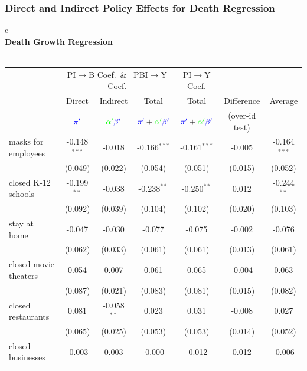 \documentclass{beamer}
\def\bcolor{\color{green}}
\def\pcolor{\color{blue}}
\renewcommand{\to}{{\rightarrow}}
\begin{document}

\begin{frame}
  \frametitle{Direct and Indirect Policy Effects for Death Regression}

\begin{table}
\begin{minipage}{\linewidth}
  \centering
    \tiny
  \begin{tabular}{c}
%    
      \\
    \textbf{{\normalsize Death Growth Regression}}
    \\
    \\
\begin{tabular}{lccc|c|cc}
\toprule
&\multicolumn{3}{c|}{ PI$\to$B Coef.\ \& \ PBI$\to$Y Coef.  } &PI$\to$Y Coef.  \\
  & Direct & Indirect & Total & Total  & Difference & Average\\\
  &${\pcolor\pi'}$&${\bcolor\alpha '}  {\pcolor \beta' }$ &${\pcolor\pi'}+{\bcolor\alpha '}  {\pcolor \beta' }$ &${\pcolor\pi'}+{\bcolor\alpha '}  {\pcolor \beta' }$  & (over-id test) \\
\midrule
masks for employees & -0.148$^{***}$ & -0.018 & -0.166$^{***}$ & -0.161$^{***}$ & -0.005 & -0.164$^{***}$\\
 & (0.049) & (0.022) & (0.054) & (0.051) & (0.015) & (0.052)\\
closed K-12 schools & -0.199$^{**}$ & -0.038 & -0.238$^{**}$ & -0.250$^{**}$ & 0.012 & -0.244$^{**}$\\
 & (0.092) & (0.039) & (0.104) & (0.102) & (0.020) & (0.103)\\
stay at home & -0.047 & -0.030 & -0.077 & -0.075 & -0.002 & -0.076\\
 & (0.062) & (0.033) & (0.061) & (0.061) & (0.013) & (0.061)\\
closed movie theaters & 0.054 & 0.007 & 0.061 & 0.065 & -0.004 & 0.063\\
 & (0.087) & (0.021) & (0.083) & (0.081) & (0.015) & (0.082)\\
closed restaurants & 0.081 & -0.058$^{**}$ & 0.023 & 0.031 & -0.008 & 0.027\\
 & (0.065) & (0.025) & (0.053) & (0.053) & (0.014) & (0.052)\\
closed businesses & -0.003 & 0.003 & -0.000 & -0.012 & 0.012 & -0.006\\

\end{tabular}
\end{tabular}
\end{minipage}
\end{table}
\end{frame}
\end{document}
